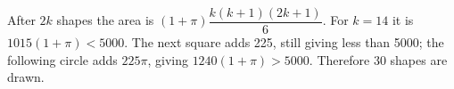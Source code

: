 After $2k$ shapes the area is $(1+\pi)\dfrac{k(k+1)(2k+1)}{6}$. For $k=14$ it is $1015(1+\pi)<5000$. The next square adds 225, still giving less than 5000; the following circle adds $225\pi$, giving $1240(1+\pi)>5000$. Therefore $\boxed{30}$ shapes are drawn.
